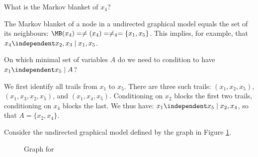 \begin{exenumerate}
\item What is the Markov blanket of $x_4$?

  \begin{solution}

    The Markov blanket of a node in a undirected graphical model equals the set of its neighbours: $\MB(x_4) = \ne(x_4) = \ne_4 = \{x_1,x_5\}$.  This implies, for example, that
    $x_4 \independent x_2,x_3 \mid x_1,x_5$.
  \end{solution}

\item On which minimal set of variables $A$ do we need to condition to have $x_1 \independent x_5 \mid A$?

  \begin{solution}
We first identify all trails from $x_1$ to $x_5$. There are three such trails: $(x_1,x_2,x_5)$, $(x_1, x_3, x_2, x_5)$, and $(x_1,x_4, x_5)$. Conditioning on $x_2$ blocks the first two trails, conditioning on $x_4$ blocks the last. We thus have: $x_1 \independent x_5 \mid x_2,x_4$, so that $A=\{x_2,x_4\}$.

\end{solution}

\end{exenumerate}


\label{ex:factorisation-independencies-undirected-graphical-model}
Consider the undirected graphical model defined by the graph in Figure \ref{fig:undirected-graphical-model}.
  \begin{figure}[h]
  \begin{center}
  \end{center}
  \caption{\label{fig:undirected-graphical-model} Graph for }
\end{figure}

